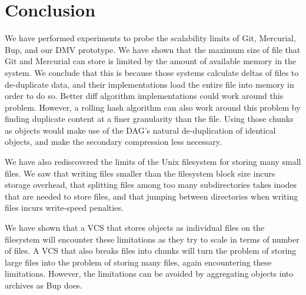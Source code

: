 \section{Conclusion}

We have performed experiments to probe the scalability limits of Git, Mercurial, Bup, and our DMV prototype.
We have shown that the maximum size of file that Git and Mercurial can store is limited by the amount of available memory in the system.
We conclude that this is because those systems calculate deltas of files to de-duplicate data, and their implementations load the entire file into memory in order to do so.
Better diff algorithm implementations could work around this problem.
However, a rolling hash algorithm can also work around this problem by finding duplicate content at a finer granularity than the file.
Using those chunks as objects would make use of the DAG's natural de-duplication of identical objects, and make the secondary compression less necessary.

We have also rediscovered the limits of the Unix filesystem for storing many small files.
We saw that writing files smaller than the filesystem block size incurs storage overhead, that splitting files among too many subdirectories takes \glspl{inode} that are needed to store files, and that jumping between directories when writing files incurs write-speed penalties.

We have shown that a \gls{VCS} that stores objects as individual files on the filesystem will encounter these limitations as they try to scale in terms of number of files.
A \gls{VCS} that also breaks files into chunks will turn the problem of storing large files into the problem of storing many files, again encountering these limitations.
However, the limitations can be avoided by aggregating objects into archives as Bup does.
